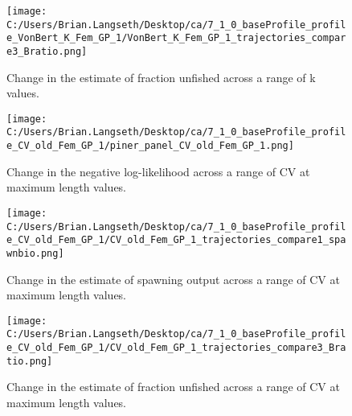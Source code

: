\documentclass[11pt,
  english,
  letterpaper,
]{article}
\begin{document}
\tagmcend\tagstructend


\begin{figure}
\centering
\texttt{[image: C:/Users/Brian.Langseth/Desktop/ca/7\_1\_0\_baseProfile\_profile\_VonBert\_K\_Fem\_GP\_1/VonBert\_K\_Fem\_GP\_1\_trajectories\_compare3\_Bratio.png]}
\caption{Change in the estimate of fraction unfished across a range of k values.\label{fig:k-depl}}
\end{figure}

\tagmcend\tagstructend


\begin{figure}
\centering
\texttt{[image: C:/Users/Brian.Langseth/Desktop/ca/7\_1\_0\_baseProfile\_profile\_CV\_old\_Fem\_GP\_1/piner\_panel\_CV\_old\_Fem\_GP\_1.png]}
\caption{Change in the negative log-likelihood across a range of CV at maximum length values.\label{fig:cv2-profile}}
\end{figure}

\tagmcend\tagstructend


\begin{figure}
\centering
\texttt{[image: C:/Users/Brian.Langseth/Desktop/ca/7\_1\_0\_baseProfile\_profile\_CV\_old\_Fem\_GP\_1/CV\_old\_Fem\_GP\_1\_trajectories\_compare1\_spawnbio.png]}
\caption{Change in the estimate of spawning output across a range of CV at maximum length values.\label{fig:cv2-ssb}}
\end{figure}

\tagmcend\tagstructend


\begin{figure}
\centering
\texttt{[image: C:/Users/Brian.Langseth/Desktop/ca/7\_1\_0\_baseProfile\_profile\_CV\_old\_Fem\_GP\_1/CV\_old\_Fem\_GP\_1\_trajectories\_compare3\_Bratio.png]}
\caption{Change in the estimate of fraction unfished across a range of CV at maximum length values.\label{fig:cv2-depl}}
\end{figure}
\end{document}
